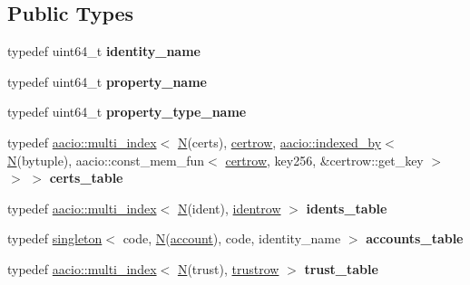 \subsection*{Public Types}
\begin{DoxyCompactItemize}
\item 
\mbox{\label{classidentity_1_1contract_ab9118d67eda282db96f8119a7f0832ba}} 
typedef uint64\+\_\+t {\bfseries identity\+\_\+name}
\item 
\mbox{\label{classidentity_1_1contract_a9edca5bc03e9ad1803f825a117fbddf1}} 
typedef uint64\+\_\+t {\bfseries property\+\_\+name}
\item 
\mbox{\label{classidentity_1_1contract_a0fc8065dc5c69f24f347568f742d5e07}} 
typedef uint64\+\_\+t {\bfseries property\+\_\+type\+\_\+name}
\item 
\mbox{\label{classidentity_1_1contract_a47029a4139c72d4f1c4179bd568a2648}} 
typedef \mbox{\hyperlink{classaacio_1_1multi__index}{aacio\+::multi\+\_\+index}}$<$ \mbox{\hyperlink{group__types_gaf9c1edb0e0da55ec6ba09f32f6839529}{N}}(certs), \mbox{\hyperlink{structidentity_1_1contract_1_1certrow}{certrow}}, \mbox{\hyperlink{structaacio_1_1indexed__by}{aacio\+::indexed\+\_\+by}}$<$ \mbox{\hyperlink{group__types_gaf9c1edb0e0da55ec6ba09f32f6839529}{N}}(bytuple), aacio\+::const\+\_\+mem\+\_\+fun$<$ \mbox{\hyperlink{structidentity_1_1contract_1_1certrow}{certrow}}, key256, \&certrow\+::get\+\_\+key $>$ $>$ $>$ {\bfseries certs\+\_\+table}
\item 
\mbox{\label{classidentity_1_1contract_a826a2e8e9dd77d5dea76683458cb0195}} 
typedef \mbox{\hyperlink{classaacio_1_1multi__index}{aacio\+::multi\+\_\+index}}$<$ \mbox{\hyperlink{group__types_gaf9c1edb0e0da55ec6ba09f32f6839529}{N}}(ident), \mbox{\hyperlink{structidentity_1_1contract_1_1identrow}{identrow}} $>$ {\bfseries idents\+\_\+table}
\item 
\mbox{\label{classidentity_1_1contract_aa2e87f06ce25879dd96a31784fbb5e18}} 
typedef \mbox{\hyperlink{classaacio_1_1singleton}{singleton}}$<$ code, \mbox{\hyperlink{group__types_gaf9c1edb0e0da55ec6ba09f32f6839529}{N}}(\mbox{\hyperlink{structaccount}{account}}), code, identity\+\_\+name $>$ {\bfseries accounts\+\_\+table}
\item 
\mbox{\label{classidentity_1_1contract_ab17f410eb91d7c7334e71c979b63ea7c}} 
typedef \mbox{\hyperlink{classaacio_1_1multi__index}{aacio\+::multi\+\_\+index}}$<$ \mbox{\hyperlink{group__types_gaf9c1edb0e0da55ec6ba09f32f6839529}{N}}(trust), \mbox{\hyperlink{structidentity_1_1contract_1_1trustrow}{trustrow}} $>$ {\bfseries trust\+\_\+table}
\end{DoxyCompactItemize}
